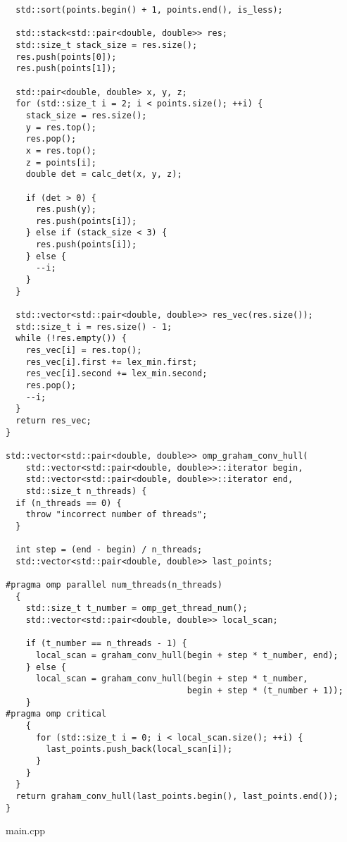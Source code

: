 \documentclass{report}
\begin{document}
\begin{lstlisting}
  std::sort(points.begin() + 1, points.end(), is_less);

  std::stack<std::pair<double, double>> res;
  std::size_t stack_size = res.size();
  res.push(points[0]);
  res.push(points[1]);

  std::pair<double, double> x, y, z;
  for (std::size_t i = 2; i < points.size(); ++i) {
    stack_size = res.size();
    y = res.top();
    res.pop();
    x = res.top();
    z = points[i];
    double det = calc_det(x, y, z);

    if (det > 0) {
      res.push(y);
      res.push(points[i]);
    } else if (stack_size < 3) {
      res.push(points[i]);
    } else {
      --i;
    }
  }

  std::vector<std::pair<double, double>> res_vec(res.size());
  std::size_t i = res.size() - 1;
  while (!res.empty()) {
    res_vec[i] = res.top();
    res_vec[i].first += lex_min.first;
    res_vec[i].second += lex_min.second;
    res.pop();
    --i;
  }
  return res_vec;
}

std::vector<std::pair<double, double>> omp_graham_conv_hull(
    std::vector<std::pair<double, double>>::iterator begin,
    std::vector<std::pair<double, double>>::iterator end,
    std::size_t n_threads) {
  if (n_threads == 0) {
    throw "incorrect number of threads";
  }

  int step = (end - begin) / n_threads;
  std::vector<std::pair<double, double>> last_points;

#pragma omp parallel num_threads(n_threads)
  {
    std::size_t t_number = omp_get_thread_num();
    std::vector<std::pair<double, double>> local_scan;

    if (t_number == n_threads - 1) {
      local_scan = graham_conv_hull(begin + step * t_number, end);
    } else {
      local_scan = graham_conv_hull(begin + step * t_number,
                                    begin + step * (t_number + 1));
    }
#pragma omp critical
    {
      for (std::size_t i = 0; i < local_scan.size(); ++i) {
        last_points.push_back(local_scan[i]);
      }
    }
  }
  return graham_conv_hull(last_points.begin(), last_points.end());
}

\end{lstlisting}
main.cpp
\end{document}
